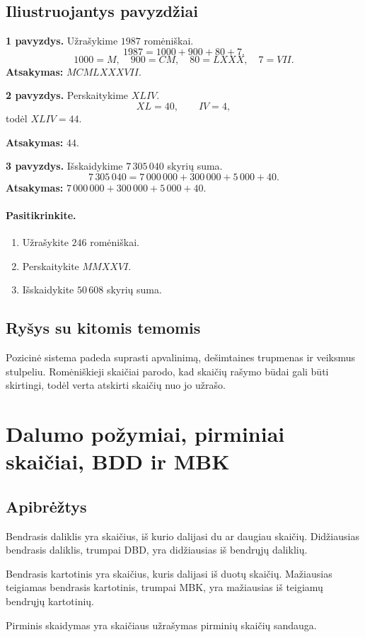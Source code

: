 \subsection{Iliustruojantys pavyzdžiai}
\textbf{1 pavyzdys.} Užrašykime \(1987\) romėniškai.
\[
1987=1000+900+80+7.
\]
\[
1000=M,\quad 900=CM,\quad 80=LXXX,\quad 7=VII.
\]
\textbf{Atsakymas:} \(MCMLXXXVII\).

\textbf{2 pavyzdys.} Perskaitykime \(XLIV\).
\[
XL=40,\qquad IV=4,
\]
todėl \(XLIV=44\).

\textbf{Atsakymas:} \(44\).

\textbf{3 pavyzdys.} Išskaidykime \(7\,305\,040\) skyrių suma.
\[
7\,305\,040=7\,000\,000+300\,000+5\,000+40.
\]
\textbf{Atsakymas:} \(7\,000\,000+300\,000+5\,000+40\).

\paragraph{Pasitikrinkite.}
\begin{enumerate}[label=\arabic*.]
\item Užrašykite \(246\) romėniškai.
\item Perskaitykite \(MMXXVI\).
\item Išskaidykite \(50\,608\) skyrių suma.
\end{enumerate}

\subsection{Ryšys su kitomis temomis}
Pozicinė sistema padeda suprasti apvalinimą, dešimtaines trupmenas ir veiksmus stulpeliu. Romėniškieji skaičiai parodo, kad skaičių rašymo būdai gali būti skirtingi, todėl verta atskirti skaičių nuo jo užrašo.

\section{Dalumo požymiai, pirminiai skaičiai, BDD ir MBK}\label{sec:dalumo-pozymiai-pirminiai-skaiciai-bdd-mbk}

\subsection{Apibrėžtys}
\begin{apibreztis}
Bendrasis daliklis yra skaičius, iš kurio dalijasi du ar daugiau skaičių. Didžiausias bendrasis daliklis, trumpai DBD, yra didžiausias iš bendrųjų daliklių.
\end{apibreztis}
\begin{apibreztis}
Bendrasis kartotinis yra skaičius, kuris dalijasi iš duotų skaičių. Mažiausias teigiamas bendrasis kartotinis, trumpai MBK, yra mažiausias iš teigiamų bendrųjų kartotinių.
\end{apibreztis}
\begin{apibreztis}
Pirminis skaidymas yra skaičiaus užrašymas pirminių skaičių sandauga.
\end{apibreztis}

